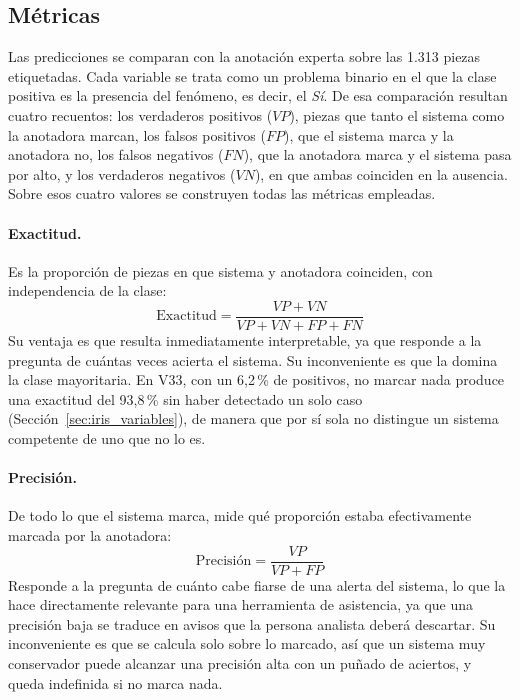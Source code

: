 
\subsection{Métricas}
\label{sec:metricas_eval}

Las predicciones se comparan con la anotación experta sobre las 1.313 piezas
etiquetadas. Cada variable se trata como un problema binario en el que la clase
positiva es la presencia del fenómeno, es decir, el \textit{Sí}. De esa
comparación resultan cuatro recuentos: los verdaderos positivos ($VP$), piezas que
tanto el sistema como la anotadora marcan, los falsos positivos ($FP$), que el
sistema marca y la anotadora no, los falsos negativos ($FN$), que la anotadora
marca y el sistema pasa por alto, y los verdaderos negativos ($VN$), en que ambas
coinciden en la ausencia. Sobre esos cuatro valores se construyen todas las
métricas empleadas.

\paragraph{Exactitud.} Es la proporción de piezas en que sistema y anotadora
coinciden, con independencia de la clase:
\begin{equation}
    \text{Exactitud} = \frac{VP + VN}{VP + VN + FP + FN}
\end{equation}
Su ventaja es que resulta inmediatamente interpretable, ya que responde a la
pregunta de cuántas veces acierta el sistema. Su inconveniente es que la domina la
clase mayoritaria. En V33, con un 6,2\,\% de positivos, no marcar nada produce una
exactitud del 93,8\,\% sin haber detectado un solo caso
(Sección~\ref{sec:iris_variables}), de manera que por sí sola no distingue un
sistema competente de uno que no lo es.

\paragraph{Precisión.} De todo lo que el sistema marca, mide qué proporción estaba
efectivamente marcada por la anotadora:
\begin{equation}
    \text{Precisión} = \frac{VP}{VP + FP}
\end{equation}
Responde a la pregunta de cuánto cabe fiarse de una alerta del sistema, lo que la
hace directamente relevante para una herramienta de asistencia, ya que una
precisión baja se traduce en avisos que la persona analista deberá descartar. Su
inconveniente es que se calcula solo sobre lo marcado, así que un sistema muy
conservador puede alcanzar una precisión alta con un puñado de aciertos, y
queda indefinida si no marca nada.

